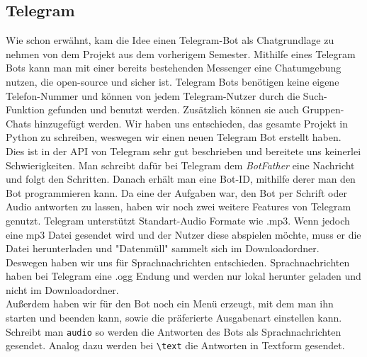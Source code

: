 \documentclass[12pt]{article}
\begin{document}
\subsection{Telegram}\label{subsec:telegram}
Wie schon erwähnt, kam die Idee einen Telegram-Bot als Chatgrundlage zu nehmen von dem Projekt aus dem vorherigem Semester.  Mithilfe eines Telegram Bots kann man mit einer bereits bestehenden Messenger eine Chatumgebung nutzen, die open-source und sicher ist. Telegram Bots benötigen keine eigene Telefon-Nummer und können von jedem Telegram-Nutzer durch die Such-Funktion gefunden und benutzt werden. Zusätzlich können sie auch Gruppen-Chats hinzugefügt werden. 
Wir haben uns entschieden, das gesamte Projekt in Python zu schreiben, weswegen wir einen neuen Telegram Bot erstellt haben. Dies ist in der API von Telegram sehr gut beschrieben und bereitete uns keinerlei Schwierigkeiten. Man schreibt dafür bei Telegram dem \textit{BotFather} eine Nachricht und folgt den Schritten.  Danach erhält man eine Bot-ID, mithilfe derer man den Bot programmieren kann. 
Da eine der Aufgaben war, den Bot per Schrift oder Audio antworten zu lassen, haben wir noch zwei weitere Features von Telegram genutzt. Telegram unterstützt Standart-Audio Formate wie .mp3. Wenn jedoch eine mp3 Datei gesendet wird und der Nutzer diese abspielen möchte, muss er die Datei herunterladen und "Datenmüll" sammelt sich im Downloadordner. Deswegen haben wir uns für Sprachnachrichten entschieden. Sprachnachrichten haben bei Telegram eine .ogg Endung und werden nur lokal herunter geladen und nicht im Downloadordner. \\
Außerdem haben wir für den Bot noch ein Menü erzeugt, mit dem man ihn starten und beenden kann, sowie die präferierte Ausgabenart einstellen kann. Schreibt man \texttt{\textbacklash audio} so werden die Antworten des Bots als Sprachnachrichten gesendet. Analog dazu werden bei \texttt{\textbackslash text} die Antworten in Textform gesendet.
\end{document}
